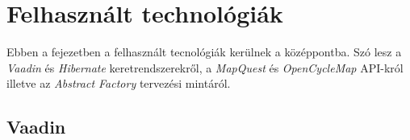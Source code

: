 



\setlength{\parindent}{4em}
\setlength{\parskip}{1em}
\chapter{Felhasznált technológiák}\label{ch:FELH}

\begin{osszefoglal}
	Ebben a fejezetben a felhasznált tecnológiák kerülnek a középpontba. Szó lesz a \textit{Vaadin}\cite{Vaadin} és \textit{Hibernate}\cite{Hibernate} keretrendszerekről,  a \textit{MapQuest}\cite{MapQuestJsApi} és \textit{OpenCycleMap}\cite{OpenCycleMap} API-król illetve az \textit{Abstract Factory} tervezési mintáról.
\end{osszefoglal}

\section{Vaadin}\label{sec:FELH:va}

